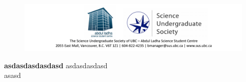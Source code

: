 \documentclass{article}%
\begin{document}
%


\begin{figure}[h]%
\includegraphics[width=550px]{Invoices/sus_header.png}%
\end{figure}
\noindent
\textbf{asdasdasdasdasd} asdasdasdasd \\
asasd
\end{document}
